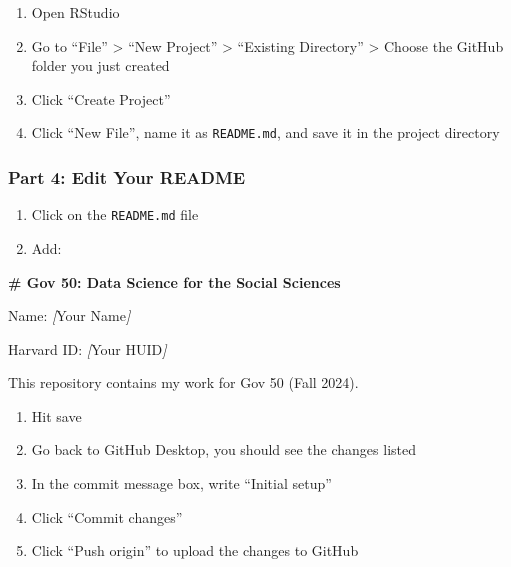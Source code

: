 \documentclass[
  11pt,
  letterpaper]{article}
\newenvironment{Shaded}{\begin{snugshade}}{\end{snugshade}}
\newcommand{\CommentTok}[1]{\textcolor[rgb]{0.56,0.35,0.01}{\textit{#1}}}
\newcommand{\FunctionTok}[1]{\textcolor[rgb]{0.13,0.29,0.53}{\textbf{#1}}}
\newcommand{\NormalTok}[1]{#1}
\newcommand{\OtherTok}[1]{\textcolor[rgb]{0.56,0.35,0.01}{#1}}
\providecommand{\tightlist}{%
  \setlength{\itemsep}{0pt}\setlength{\parskip}{0pt}}
\begin{document}
\begin{enumerate}
\def\labelenumi{\arabic{enumi}.}
\tightlist
\item
  Open RStudio
\item
  Go to ``File'' \textgreater{} ``New Project'' \textgreater{}
  ``Existing Directory'' \textgreater{} Choose the GitHub folder you
  just created
\item
  Click ``Create Project''
\item
  Click ``New File'', name it as \texttt{README.md}, and save it in the
  project directory
\end{enumerate}

\subsubsection{Part 4: Edit Your README}\label{part-4-edit-your-readme}

\begin{enumerate}
\def\labelenumi{\arabic{enumi}.}
\tightlist
\item
  Click on the \texttt{README.md} file
\item
  Add:
\end{enumerate}

\begin{Shaded}
\begin{Highlighting}[]
\FunctionTok{\# Gov 50: Data Science for the Social Sciences}

\NormalTok{Name: }\CommentTok{[}\OtherTok{Your Name}\CommentTok{]}

\NormalTok{Harvard ID: }\CommentTok{[}\OtherTok{Your HUID}\CommentTok{]}

\NormalTok{This repository contains my work for Gov 50 (Fall 2024).}
\end{Highlighting}
\end{Shaded}

\begin{enumerate}
\def\labelenumi{\arabic{enumi}.}
\setcounter{enumi}{2}
\tightlist
\item
  Hit save
\item
  Go back to GitHub Desktop, you should see the changes listed
\item
  In the commit message box, write ``Initial setup''
\item
  Click ``Commit changes''
\item
  Click ``Push origin'' to upload the changes to GitHub
\end{enumerate}
\end{document}
